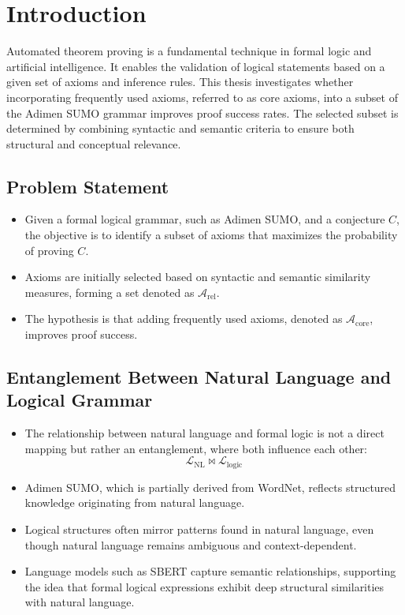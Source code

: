 \documentclass[english,version-2020-11]{uzl-thesis}
\begin{document}
%
%


\chapter{Introduction}
\label{chapter-introduction}

Automated theorem proving is a fundamental technique in formal logic and artificial intelligence. It enables the validation of logical statements based on a given set of axioms and inference rules. This thesis investigates whether incorporating frequently used axioms, referred to as core axioms, into a subset of the Adimen SUMO grammar improves proof success rates. The selected subset is determined by combining syntactic and semantic criteria to ensure both structural and conceptual relevance.

\section{Problem Statement}
\begin{itemize}
    \item Given a formal logical grammar, such as Adimen SUMO, and a conjecture \( C \), the objective is to identify a subset of axioms that maximizes the probability of proving \( C \).
    \item Axioms are initially selected based on syntactic and semantic similarity measures, forming a set denoted as \( \mathcal{A}_{\text{rel}} \).
    \item The hypothesis is that adding frequently used axioms, denoted as \( \mathcal{A}_{\text{core}} \), improves proof success.
\end{itemize}

\section{Entanglement Between Natural Language and Logical Grammar}
\begin{itemize}
    \item The relationship between natural language and formal logic is not a direct mapping but rather an entanglement, where both influence each other:
    \begin{equation}
        \mathcal{L}_{\text{NL}} \bowtie \mathcal{L}_{\text{logic}}
    \end{equation}
    \item Adimen SUMO, which is partially derived from WordNet, reflects structured knowledge originating from natural language.
    \item Logical structures often mirror patterns found in natural language, even though natural language remains ambiguous and context-dependent.
    \item Language models such as SBERT capture semantic relationships, supporting the idea that formal logical expressions exhibit deep structural similarities with natural language.
\end{itemize}
\end{document}
